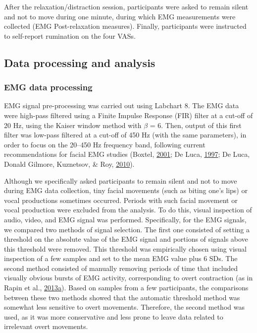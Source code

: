 \documentclass[a4paper,12pt,twoside,onecolumn,openright,final,oldfontcommands]{memoir}
\begin{document}
After the relaxation/distraction session, participants were asked to remain silent and not to move during one minute, during which EMG measurements were collected (EMG Post-relaxation measures). Finally, participants were instructed to self-report rumination on the four VASs.

\hypertarget{data-processing-and-analysis}{%
\subsection{Data processing and analysis}\label{data-processing-and-analysis}}

\hypertarget{emg-data-processing}{%
\subsubsection{EMG data processing}\label{emg-data-processing}}

EMG signal pre-processing was carried out using Labchart 8. The EMG data were high-pass filtered using a Finite Impulse Response (FIR) filter at a cut-off of 20 Hz, using the Kaiser window method with \(\beta\) = 6. Then, output of this first filter was low-pass filtered at a cut-off of 450 Hz (with the same parameters), in order to focus on the 20--450 Hz frequency band, following current recommendations for facial EMG studies (Boxtel, \protect\hyperlink{ref-boxtel_optimal_2001}{2001}; De Luca, \protect\hyperlink{ref-de_luca_use_1997}{1997}; De Luca, Donald Gilmore, Kuznetsov, \& Roy, \protect\hyperlink{ref-de_luca_filtering_2010}{2010}).

Although we specifically asked participants to remain silent and not to move during EMG data collection, tiny facial movements (such as biting one's lips) or vocal productions sometimes occurred. Periods with such facial movement or vocal production were excluded from the analysis. To do this, visual inspection of audio, video, and EMG signal was performed. Specifically, for the EMG signals, we compared two methods of signal selection. The first one consisted of setting a threshold on the absolute value of the EMG signal and portions of signals above this threshold were removed. This threshold was empirically chosen using visual inspection of a few samples and set to the mean EMG value plus 6 SDs. The second method consisted of manually removing periods of time that included visually obvious bursts of EMG activity, corresponding to overt contraction (as in Rapin et al., \protect\hyperlink{ref-rapin_emg_2013}{2013}\protect\hyperlink{ref-rapin_emg_2013}{a}). Based on samples from a few participants, the comparisons between these two methods showed that the automatic threshold method was somewhat less sensitive to overt movements. Therefore, the second method was used, as it was more conservative and less prone to leave data related to irrelevant overt movements.
\end{document}
